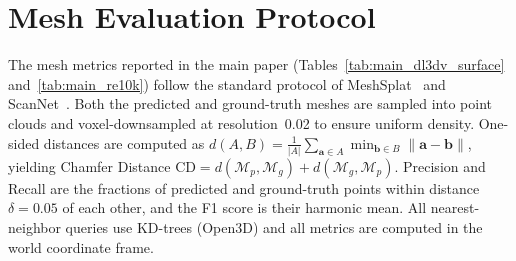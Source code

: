 \documentclass{llmxive}
\begin{document}
\section{Mesh Evaluation Protocol}
\label{sec:app_mesh_eval}

The mesh metrics reported in the main paper (Tables~\ref{tab:main_dl3dv_surface} and~\ref{tab:main_re10k}) follow the standard protocol of MeshSplat~\citep{chang2025meshsplat} and ScanNet~\citep{dai2017scannet}. Both the predicted and ground-truth meshes are sampled into point clouds and voxel-downsampled at resolution~0.02 to ensure uniform density. One-sided distances are computed as $d(A, B) = \frac{1}{|A|} \sum_{\mathbf{a} \in A} \min_{\mathbf{b} \in B} \|\mathbf{a} - \mathbf{b}\|$, yielding Chamfer Distance $\mathrm{CD} = d(\mathcal{M}_p, \mathcal{M}_g) + d(\mathcal{M}_g, \mathcal{M}_p)$. Precision and Recall are the fractions of predicted and ground-truth points within distance $\delta = 0.05$ of each other, and the F1 score is their harmonic mean. All nearest-neighbor queries use KD-trees (Open3D) and all metrics are computed in the world coordinate frame.
\end{document}

